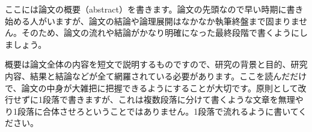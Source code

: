 ここには論文の概要（abstract）を書きます。論文の先頭なので早い時期に書き始める人がいますが、論文の結論や論理展開はなかなか執筆終盤まで固まりません。そのため、論文の流れや結論がかなり明確になった最終段階で書くようにしましょう。

概要は論文全体の内容を短文で説明するものですので、研究の背景と目的、研究内容、結果と結論などが全て網羅されている必要があります。ここを読んだだけで、論文の中身が大雑把に把握できるようにすることが大切です。原則として改行せずに1段落で書きますが、これは複数段落に分けて書くような文章を無理やり1段落に合体させろということではありません。1段落で流れるように書いてください。
